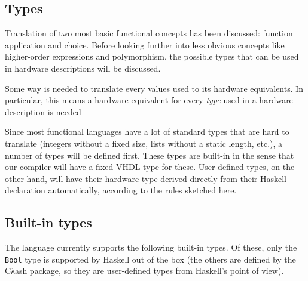 \documentclass[conference]{IEEEtran}
\def\hs#1{\texttt{#1}}
\begin{document}
  \subsection{Types}
    Translation of two most basic functional concepts has been
    discussed: function application and choice. Before looking further
    into less obvious concepts like higher-order expressions and
    polymorphism, the possible types that can be used in hardware
    descriptions will be discussed.

    Some way is needed to translate every values used to its hardware
    equivalents. In particular, this means a hardware equivalent for
    every \emph{type} used in a hardware description is needed

    Since most functional languages have a lot of standard types that
    are hard to translate (integers without a fixed size, lists without
    a static length, etc.), a number of  types will be
    defined first. These types are built-in in the sense that our
    compiler will have a fixed VHDL type for these. User defined types,
    on the other hand, will have their hardware type derived directly
    from their Haskell declaration automatically, according to the rules
    sketched here.

  \subsection{Built-in types}
    The language currently supports the following built-in types. Of these,
    only the \hs{Bool} type is supported by Haskell out of the box (the
    others are defined by the Cλash package, so they are user-defined types
    from Haskell's point of view).
\end{document}
